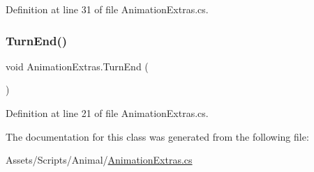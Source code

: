 Definition at line 31 of file Animation\+Extras.\+cs.

\mbox{\label{class_animation_extras_a36c35f06a9216bebdfe871206cb69778}} 
\subsubsection{\texorpdfstring{Turn\+End()}{TurnEnd()}}
{\footnotesize\ttfamily void Animation\+Extras.\+Turn\+End (\begin{DoxyParamCaption}{ }\end{DoxyParamCaption})}



Definition at line 21 of file Animation\+Extras.\+cs.



The documentation for this class was generated from the following file\+:\begin{DoxyCompactItemize}
\item 
Assets/\+Scripts/\+Animal/\mbox{\hyperlink{_animation_extras_8cs}{Animation\+Extras.\+cs}}\end{DoxyCompactItemize}
